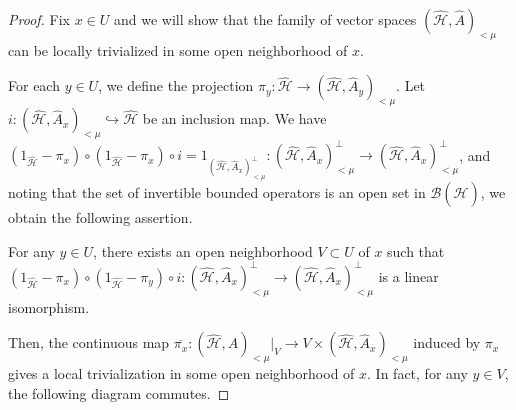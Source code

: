 \documentclass{amsart}
\theoremstyle{definition}
\theoremstyle{remark}
\begin{document}
 
 \begin{proof}
Fix $x \in U$ and we will show that the family of vector spaces $(\hat{\mathcal{H}},\hat{A})_{<\mu}$ can be locally trivialized in some open neighborhood of $x$.

For each \( y \in U \), we define the projection \( \pi_y :\hat{\mathcal{H}} \to (\hat{\mathcal{H}}, \hat{A}_y)_{<\mu} \). Let $i:(\hat{\mathcal{H}}, \hat{A}_x)_{<\mu} \hookrightarrow \hat{\mathcal{H}}$ be an inclusion map.
We have $(1_{\hat{\mathcal{H}}}-\pi_{x})\circ(1_{\hat{\mathcal{H}}}-\pi_{x})\circ i=1_{(\hat{\mathcal{H}}, \hat{A}_x)_{<\mu}^{\perp}}:(\hat{\mathcal{H}}, \hat{A}_x)_{<\mu}^{\perp} \to (\hat{\mathcal{H}}, \hat{A}_x)_{<\mu}^{\perp}$,
and noting that the set of invertible bounded operators is an open set in $\mathcal{B}(\hat{\mathcal{H}})$,
we obtain the following assertion.

For any $y \in U$, there exists an open neighborhood $V \subset U$ of $x$ such that $(1_{\hat{\mathcal{H}}}-\pi_{x})\circ(1_{\hat{\mathcal{H}}}-\pi_{y})\circ i:(\hat{\mathcal{H}}, \hat{A}_x)_{<\mu}^{\perp} \to (\hat{\mathcal{H}}, \hat{A}_x)_{<\mu}^{\perp}$ is a linear isomorphism.

Then, the continuous map $\overline{\pi_{x}}:(\hat{\mathcal{H}}, \hat{A})_{<\mu}|_{V}\to V\times(\hat{\mathcal{H}}, \hat{A}_x)_{<\mu}$ induced by $\pi_{x}$ gives a local trivialization in some open neighborhood of $x$. In fact, for any $y \in V$, the following diagram commutes.

\end{proof}
\end{document}
